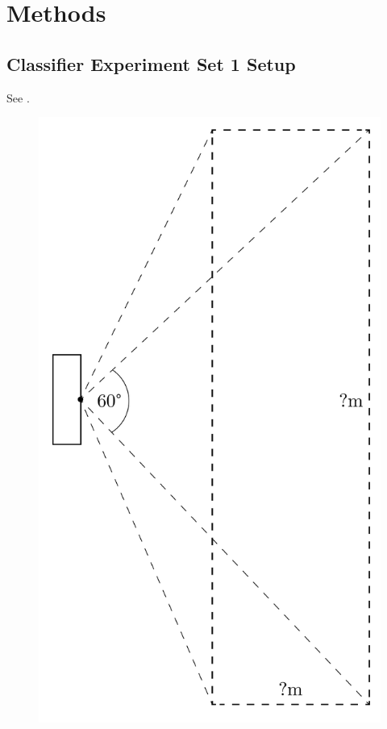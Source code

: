 \documentclass[../thesis/thesis.tex]{subfiles}
\begin{document}
 \chapter{Methods}

 \section{Classifier Experiment Set 1 Setup}
See .

 \begin{figure}
 \centering
 \includegraphics[height=0.8\textheight,page=1]{../diagrams/third-exp-setup.pdf}

\end{figure}
\end{document}
